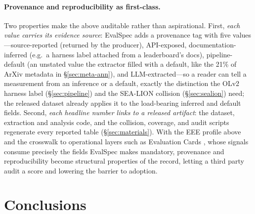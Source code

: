 \documentclass[11pt]{article}
\begin{document}
\paragraph{Provenance and reproducibility as first-class.} Two properties make the
above auditable rather than aspirational. First, \emph{each value carries its
evidence source}: EvalSpec adds a provenance tag with five values---source-reported
(returned by the producer), API-exposed, documentation-inferred (e.g.\ a harness
label attached from a leaderboard's docs), pipeline-default (an unstated value the
extractor filled with a default, like the 21\% of ArXiv metadata in
\S\ref{sec:meta-ann}), and LLM-extracted---so a reader can tell a measurement from an
inference or a default, exactly the distinction the OLv2 harness label
(\S\ref{sec:pipeline}) and the SEA-LION collision (\S\ref{sec:sealion}) need; the
released dataset already applies it to the load-bearing inferred and default fields. Second, \emph{each headline number links to a
released artifact}: the dataset, extraction and analysis code, and the collision,
coverage, and audit scripts regenerate every reported table (\S\ref{sec:materials}).
With the EEE profile above and the crosswalk to
operational layers such as Evaluation Cards \citep{ghosh2026evalcards}, whose
signals consume precisely the fields EvalSpec makes mandatory, provenance and
reproducibility become structural properties of the record, letting a third party
audit a score and lowering the barrier to adoption.

\section{Conclusions}

%
\end{document}
